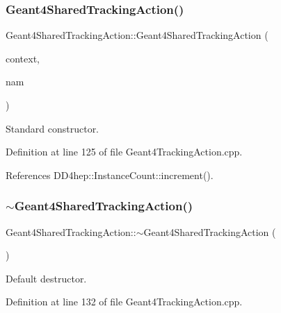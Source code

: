 \subsubsection{\texorpdfstring{Geant4\+Shared\+Tracking\+Action()}{Geant4SharedTrackingAction()}}
{\footnotesize\ttfamily Geant4\+Shared\+Tracking\+Action\+::\+Geant4\+Shared\+Tracking\+Action (\begin{DoxyParamCaption}\item[{\hyperlink{class_d_d4hep_1_1_simulation_1_1_geant4_context}{Geant4\+Context} $\ast$}]{context,  }\item[{const std\+::string \&}]{nam }\end{DoxyParamCaption})}



Standard constructor. 



Definition at line 125 of file Geant4\+Tracking\+Action.\+cpp.



References D\+D4hep\+::\+Instance\+Count\+::increment().

\hypertarget{class_d_d4hep_1_1_simulation_1_1_geant4_shared_tracking_action_a067e930e8c51e9363ec6cb2bf7163c68}{}\label{class_d_d4hep_1_1_simulation_1_1_geant4_shared_tracking_action_a067e930e8c51e9363ec6cb2bf7163c68} 
\subsubsection{\texorpdfstring{$\sim$\+Geant4\+Shared\+Tracking\+Action()}{~Geant4SharedTrackingAction()}}
{\footnotesize\ttfamily Geant4\+Shared\+Tracking\+Action\+::$\sim$\+Geant4\+Shared\+Tracking\+Action (\begin{DoxyParamCaption}{ }\end{DoxyParamCaption})\hspace{0.3cm}{\ttfamily [virtual]}}



Default destructor. 



Definition at line 132 of file Geant4\+Tracking\+Action.\+cpp.



